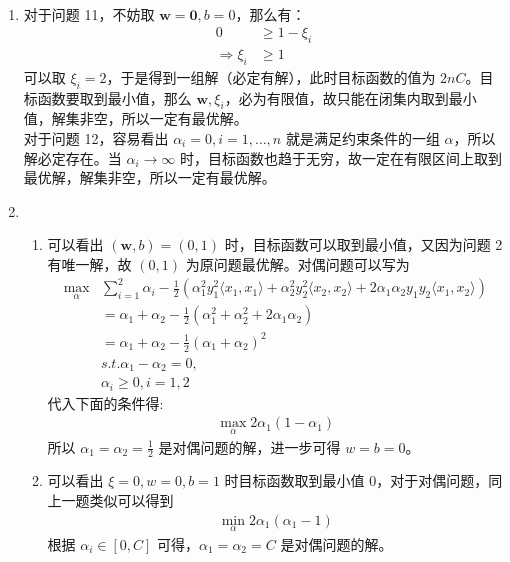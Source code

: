 \documentclass[11pt,letter,notitlepage]{article}
\begin{document}
\begin{solution}
	\heiti
	\ \\
	\begin{enumerate}
		\item 对于问题 11，不妨取 $\mathbf{w} = \mathbf{0}, b = 0$，那么有：
		\begin{align*}
			0 &\geqslant 1 - \xi_i\\
			\Rightarrow \xi_i &\geqslant 1
		\end{align*}
		可以取 $\xi_i = 2$，于是得到一组解（必定有解），此时目标函数的值为 $2nC$。目标函数要取到最小值，那么 $\mathbf{w}, \xi_i$，必为有限值，故只能在闭集内取到最小值，解集非空，所以一定有最优解。\\
		对于问题 12，容易看出 $\alpha_i = 0, i= 1,\dots, n$ 就是满足约束条件的一组 $\alpha$，所以解必定存在。当 $\alpha_i \rightarrow \infty$ 时，目标函数也趋于无穷，故一定在有限区间上取到最优解，解集非空，所以一定有最优解。
		\item \ \\
		\begin{enumerate}
			\item 可以看出 $(\mathbf{w}, b) = (0, 1)$ 时，目标函数可以取到最小值，又因为问题 2 有唯一解，故 $(0, 1)$ 为原问题最优解。对偶问题可以写为
			\begin{align*}
				\max_{\alpha} &\sum\limits_{i=1}^{2} \alpha_i - \frac{1}{2}(\alpha_1^2y_1^2\langle x_1, x_1 \rangle + \alpha_2^2y_2^2\langle x_2, x_2 \rangle +2\alpha_1\alpha_2y_1y_2\langle x_1, x_2 \rangle)\\
				&= \alpha_1 + \alpha_2 - \frac{1}{2}(\alpha_1^2 + \alpha_2^2 + 2\alpha_1\alpha_2)\\
				&= \alpha_1 + \alpha_2 - \frac{1}{2} (\alpha_1 + \alpha_2)^2\\
				&s.t. \alpha_1-\alpha_2 = 0,\\
				&\alpha_i \geqslant 0, i= 1, 2
			\end{align*}
			代入下面的条件得:
			\begin{align*}
				\max_{\alpha} 2\alpha_1(1-\alpha_1)
			\end{align*}
			所以 $\alpha_1 = \alpha_2 = \frac{1}{2}$ 是对偶问题的解，进一步可得 $w = b = 0$。
			\item 可以看出 $\xi = 0, w = 0, b = 1$ 时目标函数取到最小值 0，对于对偶问题，同上一题类似可以得到
			\begin{align*}
				\min_{\alpha} 2\alpha_1(\alpha_1 - 1)
			\end{align*}
			根据 $\alpha_i \in [0, C]$ 可得，$\alpha_1 = \alpha_2 = C$ 是对偶问题的解。

\end{enumerate}
\end{enumerate}
\end{solution}
\end{document}
